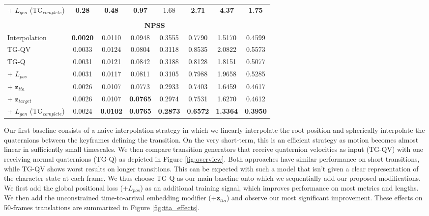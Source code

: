 \documentclass[acmtog]{acmart}
\newcommand{\bz}{\textbf{z}}
\begin{document}
\begin{table}[h]
\begin{adjustbox}{width=\columnwidth,center}
\begin{tabular}{lcccc|cc|c}
        + $L_{\mathit{gen}}$ ($\mathrm{TG}_{\mathit{complete}}$)                            & \textbf{0.28}	&\textbf{0.48} &\textbf{0.97} &1.68 &\textbf{2.71}	&\textbf{4.37} &\textbf{1.75}\\ 
        \\
        &\multicolumn{6}{c}{\textbf{NPSS}}\\
        \cmidrule(r){2-8}
        Interpolation                                   &\textbf{0.0020} &0.0110 &0.0948 &0.3555 &0.7790 &1.5170 &0.4599\\
        TG-QV                                           &0.0033	&0.0124 &0.0804 &0.3118 &0.8535	&2.0822 &0.5573\\
        \cmidrule(lr){1-8}
        TG-Q                                            &0.0031	&0.0121 &0.0842 &0.3188 &0.8128	&1.8151 &0.5077\\
        + $L_{\mathit{pos}}$                            &0.0031	&0.0117 &0.0811 &0.3105 &0.7988	&1.9658 &0.5285\\
        + $\bz_{\mathit{tta}}$                          &0.0026	&0.0107 &0.0773 &0.2933 &0.7403	&1.6459 &0.4617\\ + $\bz_{\mathit{target}}$                       &0.0026	&0.0107 &\textbf{0.0765} &0.2974 &0.7531 &1.6270 &0.4612\\
        + $L_{\mathit{gen}}$ ($\mathrm{TG}_{\mathit{complete}}$)                           &0.0024	&\textbf{0.0102} &\textbf{0.0765} &\textbf{0.2873} &\textbf{0.6572}	&\textbf{1.3364} &\textbf{0.3950}\\
\end{tabular}
    \end{adjustbox}
    \label{table:transh36}
\end{table} 
Our first baseline consists of a naive interpolation strategy in which we linearly interpolate the root position and spherically interpolate the quaternions between the keyframes defining the transition. On the very short-term, this is an efficient strategy as motion becomes almost linear in sufficiently small timescales. We then compare transition generators that receive quaternion velocities as input (TG-QV) with one receiving normal quaternions (TG-Q) as depicted in Figure \ref{fig:overview}. Both approaches have similar performance on short transitions, while TG-QV shows worst results on longer transitions. This can be expected with such a model that isn't given a clear representation of the character state at each frame. We thus choose TG-Q as our main baseline onto which we sequentially add our proposed modifications. We first add the global positional loss ($+ L_{\mathit{pos}}$) as an additional training signal, which improves performance on most metrics and lengths. We then add the unconstrained time-to-arrival embedding modifier (+$\bz_{\mathit{tta}}$) and observe our most significant improvement. These effects on 50-frames translations are summarized in Figure \ref{fig:tta_effects}.
\end{document}
